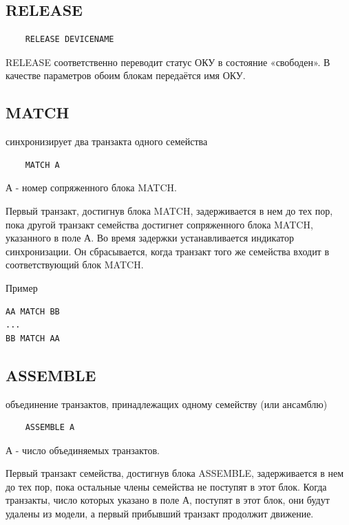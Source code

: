 \documentclass[14pt]{extarticle}
\begin{document}
\subsection*{RELEASE}

\begin{lstlisting}
	RELEASE DEVICENAME
\end{lstlisting}

RELEASE соответственно переводит статус ОКУ в состояние «свободен». В качестве параметров обоим блокам передаётся имя ОКУ.



\subsection*{MATCH}

синхронизирует два транзакта одного семейства

\begin{lstlisting}
	MATCH А
\end{lstlisting}

А - номер сопряженного блока MATCH.

Первый транзакт, достигнув блока MATCH, задерживается в нем до тех пор, пока другой транзакт семейства достигнет сопряженного блока MATCH, указанного в поле А. Во время задержки устанавливается индикатор синхронизации. Он сбрасывается, когда транзакт того же семейства входит в соответствующий блок MATCH.

Пример

\begin{lstlisting}
АA MATCH ВВ
...
ВВ MATCH АА
\end{lstlisting}


\subsection*{ASSEMBLE}

объединение транзактов, принадлежащих одному семейству (или ансамблю)

\begin{lstlisting}
	ASSEMBLE А
\end{lstlisting}

А - число объединяемых транзактов.

Первый транзакт семейства, достигнув блока ASSEMBLE, задерживается в нем до тех пор, пока остальные члены семейства не поступят в этот блок. Когда транзакты, число которых указано в поле А, поступят в этот блок, они будут удалены из модели, а первый прибывший транзакт продолжит движение.
\end{document}

